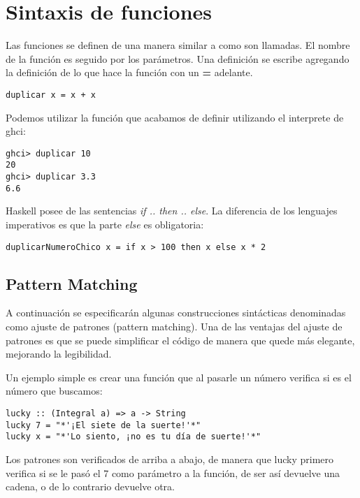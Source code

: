 \section{Sintaxis de funciones} %
\label{sec:sintaxis_de_funciones}

Las funciones se definen de una manera similar a como son llamadas. El nombre de la función es seguido por los parámetros. Una definición se escribe agregando la definición de lo que hace la función con un \textbf{=} adelante.

\begin{lstlisting}
duplicar x = x + x
\end{lstlisting}

Podemos utilizar la función que acabamos de definir utilizando el interprete de ghci:

\begin{lstlisting}
ghci> duplicar 10
20
ghci> duplicar 3.3
6.6
\end{lstlisting}

Haskell posee de las sentencias \textit{if .. then .. else}. La diferencia de los lenguajes imperativos es que la parte \textit{else} es obligatoria:

\begin{lstlisting}
duplicarNumeroChico x = if x > 100 then x else x * 2
\end{lstlisting}

\subsection{Pattern Matching} %
\label{sub:pattern_matching}

A continuación se especificarán algunas construcciones sintácticas denominadas como ajuste de patrones (pattern matching).
Una de las ventajas del ajuste de patrones es que se puede simplificar el código de manera que quede más elegante, mejorando la legibilidad.

Un ejemplo simple es crear una función que al pasarle un número verifica si es el número que buscamos:

\begin{lstlisting}
lucky :: (Integral a) => a -> String
lucky 7 = "*'¡El siete de la suerte!'*"
lucky x = "*'Lo siento, ¡no es tu día de suerte!'*"
\end{lstlisting}

Los patrones son verificados de arriba a abajo, de manera que lucky primero verifica si se le pasó el 7 como parámetro a la función, de ser así devuelve una cadena, o de lo contrario devuelve otra.

